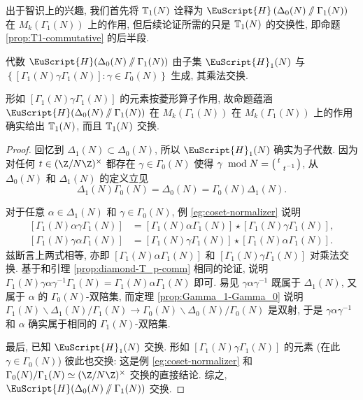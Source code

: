 出于智识上的兴趣, 我们首先将 $\mathbb{T}_1(N)$ 诠释为 $\EuScript{H}\left( \Delta_0(N) \sslash \Gamma_1(N) \right)$ 在 $M_k(\Gamma_1(N))$ 上的作用, 但后续论证所需的只是 $\mathbb{T}_1(N)$ 的交换性, 即命题 \ref{prop:T1-commutative} 的后半段.
 
\begin{proposition}\label{prop:T1-commutative}
	代数 $\EuScript{H}(\Delta_0(N) \sslash \Gamma_1(N))$ 由子集 $\EuScript{H}_1(N)$ 与 $\left\{ [\Gamma_1(N)\gamma\Gamma_1(N)] : \gamma \in \Gamma_0(N) \right\}$ 生成, 其乘法交换.
\end{proposition}

形如 $[\Gamma_1(N)\gamma\Gamma_1(N)]$ 的元素按菱形算子作用, 故命题蕴涵 $\EuScript{H}(\Delta_0(N) \sslash \Gamma_1(N))$ 在 $M_k(\Gamma_1(N))$ 在 $M_k(\Gamma_1(N))$ 上的作用确实给出 $\mathbb{T}_1(N)$, 而且 $\mathbb{T}_1(N)$ 交换.

\begin{proof}
	回忆到 $\Delta_1(N) \subset \Delta_0(N)$, 所以 $\EuScript{H}_1(N)$ 确实为子代数. 因为对任何 $t \in (\Z/N\Z)^\times$ 都存在 $\gamma \in \Gamma_0(N)$ 使得 $\gamma \;\bmod{N} = \bigl(\begin{smallmatrix} t &  \\  & t^{-1} \end{smallmatrix}\bigr)$, 从 $\Delta_0(N)$ 和 $\Delta_1(N)$ 的定义立见
	\[ \Delta_1(N) \Gamma_0(N) = \Delta_0(N) = \Gamma_0(N) \Delta_1(N). \]

	对于任意 $\alpha \in \Delta_1(N)$ 和 $\gamma \in \Gamma_0(N)$, 例 \ref{eg:coset-normalizer} 说明
	\begin{align*}
		\left[ \Gamma_1(N) \alpha \gamma \Gamma_1(N) \right] & = \left[ \Gamma_1(N)\alpha\Gamma_1(N) \right] \star \left[ \Gamma_1(N)\gamma\Gamma_1(N) \right], \\
		\left[ \Gamma_1(N) \gamma \alpha \Gamma_1(N) \right] & = \left[ \Gamma_1(N)\gamma\Gamma_1(N) \right] \star \left[ \Gamma_1(N)\alpha\Gamma_1(N) \right].
	\end{align*}
	兹断言上两式相等, 亦即 $\left[ \Gamma_1(N)\alpha\Gamma_1(N) \right]$ 和 $\left[ \Gamma_1(N)\gamma\Gamma_1(N) \right]$ 对乘法交换. 基于和引理 \ref{prop:diamond-T_p-comm} 相同的论证, 说明 $\Gamma_1(N) \gamma\alpha\gamma^{-1} \Gamma_1(N) = \Gamma_1(N)\alpha\Gamma_1(N)$ 即可. 易见 $\gamma\alpha\gamma^{-1}$ 既属于 $\Delta_1(N)$, 又属于 $\alpha$ 的 $\Gamma_0(N)$-双陪集, 而定理 \ref{prop:Gamma_1-Gamma_0} 说明 $\Gamma_1(N) \backslash \Delta_1(N) / \Gamma_1(N) \to \Gamma_0(N) \backslash \Delta_0(N) / \Gamma_0(N)$ 是双射, 于是 $\gamma\alpha\gamma^{-1}$ 和 $\alpha$ 确实属于相同的 $\Gamma_1(N)$-双陪集.
	
	最后, 已知 $\EuScript{H}_1(N)$ 交换. 形如 $[\Gamma_1(N)\gamma\Gamma_1(N)]$ 的元素 (在此 $\gamma \in \Gamma_0(N)$) 彼此也交换: 这是例 \ref{eg:coset-normalizer} 和 $\Gamma_0(N)/\Gamma_1(N) \simeq (\Z/N\Z)^\times$ 交换的直接结论. 综之, $\EuScript{H}(\Delta_0(N) \sslash \Gamma_1(N))$ 交换.
\end{proof}

